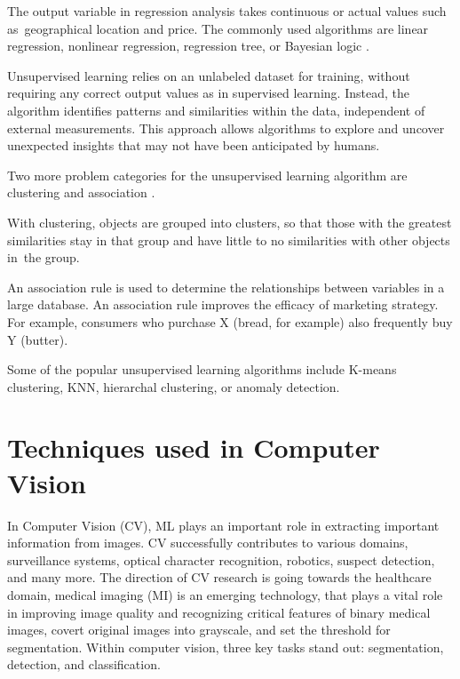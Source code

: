 The output variable in regression analysis takes continuous or actual values such as~geographical location and price. The commonly used algorithms are linear regression, nonlinear regression, regression tree, or Bayesian logic \cite{land9100346}.


Unsupervised learning relies on an unlabeled dataset for training, without requiring any correct output values as in supervised learning. Instead, the algorithm identifies patterns and similarities within the data, independent of external measurements. This approach allows algorithms to explore and uncover unexpected insights that may not have been anticipated by humans.

Two more problem categories for the unsupervised learning algorithm are clustering and association \cite{Turner2016}.


With clustering, objects are grouped into clusters, so that those with the greatest similarities stay in that group and have little to no similarities with other objects in~the group.


An association rule is used to determine the relationships between variables in a large database. An association rule improves the efficacy of marketing strategy. For example, consumers who purchase X (bread, for example) also frequently buy Y (butter).


Some of the popular unsupervised learning algorithms include K-means clustering, KNN, hierarchal clustering, or anomaly detection.

\section{Techniques used in Computer Vision }
In Computer Vision (CV), ML plays an important role in extracting important information from images. CV successfully contributes to various domains, surveillance systems, optical character recognition, robotics, suspect detection, and many more.  The direction of CV research is going towards the healthcare domain, medical imaging (MI) is an emerging technology, that plays a vital role in improving image quality and recognizing critical features of binary medical images, covert original images into grayscale, and set the threshold for segmentation.
Within computer vision, three key tasks stand out: segmentation, detection, and classification.
